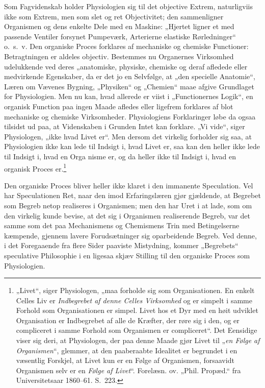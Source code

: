 \documentclass[12pt]{book}
\newcommand{\opage}[1]{\marginnote{\footnotesize\textit{[#1]}}}
\begin{document}
Som Fagvidenskab holder Physiologien sig til det objective Extrem, naturligviis ikke som Extrem, men som slet og ret Objectivitet; den sammenligner Organismen og dens enkelte Dele med en Maskine: „Hjertet ligner et med passende Ventiler forsynet Pumpeværk, Arterierne elastiske Rørledninger“ o.~s.~v. Den organiske Proces forklares af mechaniske og chemiske Functioner: Betragtningen er aldeles objectiv. Bestemmes nu Organernes Virksomhed udelukkende ved deres „anatomiske, physiske, chemiske og deraf afledede eller medvirkende Egenskaber, %
da er det jo en Selvfølge, at „den specielle Anatomie“, Læren om Vævenes Bygning, „Physiken“ og „Chemien“ maae afgive Grundlaget for Physiologien. Men nu kan, hvad allerede er viist i „Functionernes Logik“, en organisk Function paa ingen Maade afledes eller ligefrem forklares af blot mechaniske og chemiske Virksomheder. Physiologiens Forklaringer løbe da ogsaa tilsidst ud paa, at Videnskaben i Grunden Intet kan forklare. „Vi vide“, siger Physiologen, „ikke hvad Livet er“. Men dersom det virkelig forholder sig saa, at Physiologien ikke kan lede til Indsigt i, hvad Livet er, saa kan den heller ikke lede til Indsigt i, hvad en Orga%
\opage{422}nisme er, og da heller ikke til Indsigt i, hvad en organisk Proces er.\footnote{„Livet“, siger Physiologen, „maa forholde sig som Organisationen. En enkelt Celles Liv er \emph{Indbegrebet af denne Celles Virksomhed} og er simpelt i samme Forhold som Organisationen er simpel. Livet hos et Dyr med en høit udviklet Organisation er Indbegrebet af alle de Kræfter, der røre sig i den, og er compliceret i samme Forhold som Organismen er compliceret“. Det Eensidige viser sig deri, at Physiologen, der paa denne Maade gjør Livet til „\emph{en Følge af Organismen}“, glemmer, at den paaberaabte Idealitet er begrundet i en væsentlig Forskjel, at Livet kun er en Følge af Organismen, forsaavidt Organismen selv er en \emph{Følge af Livet}“. %
Forelæsn. ov. „Phil. Propæd.“ fra Universitetsaar 1860--61. S.~223.}%

Den organiske Proces bliver heller ikke klaret i den immanente Speculation. Vel har Speculationen Ret, naar den imod Erfaringslæren gjør gjældende, at Begrebet som Begreb netop realiseres i Organismen; men den har Uret i at lade, som om den virkelig kunde bevise, at det sig i Organismen realiserende Begreb, var det samme som det paa Mechanismens og Chemismens Trin med Betingelserne kæmpende, gjennem lavere Forudsætninger sig oparbeidende Begreb. Ved denne, i det Foregaaende fra flere Sider paaviste Mistydning, kommer „Begrebets“ speculative Philosophie i en ligesaa skjæv Stilling til den organiske Proces som Physiologien.
\end{document}

